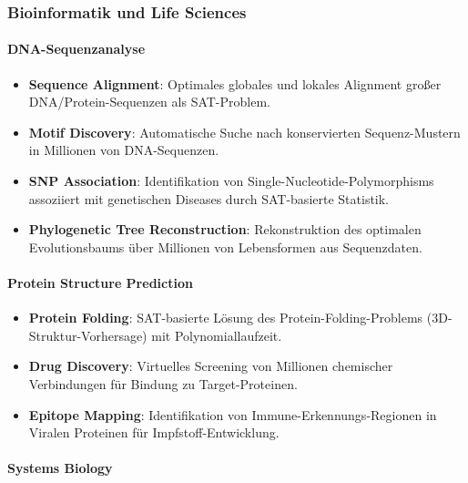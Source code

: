 ﻿\documentclass[a4paper,12pt]{article}
\theoremstyle{definition}
\begin{document}
\subsubsection{Bioinformatik und Life Sciences}

\paragraph{DNA-Sequenzanalyse}

\begin{itemize}
	\item \textbf{Sequence Alignment}: Optimales globales und lokales Alignment großer DNA/Protein-Sequenzen als SAT-Problem.
	
	\item \textbf{Motif Discovery}: Automatische Suche nach konservierten Sequenz-Mustern in Millionen von DNA-Sequenzen.
	
	\item \textbf{SNP Association}: Identifikation von Single-Nucleotide-Polymorphisms assoziiert mit genetischen Diseases durch SAT-basierte Statistik.
	
	\item \textbf{Phylogenetic Tree Reconstruction}: Rekonstruktion des optimalen Evolutionsbaums über Millionen von Lebensformen aus Sequenzdaten.
\end{itemize}

\paragraph{Protein Structure Prediction}

\begin{itemize}
	\item \textbf{Protein Folding}: SAT-basierte Lösung des Protein-Folding-Problems (3D-Struktur-Vorhersage) mit Polynomiallaufzeit.
	
	\item \textbf{Drug Discovery}: Virtuelles Screening von Millionen chemischer Verbindungen für Bindung zu Target-Proteinen.
	
	\item \textbf{Epitope Mapping}: Identifikation von Immune-Erkennungs-Regionen in Viralen Proteinen für Impfstoff-Entwicklung.
\end{itemize}

\paragraph{Systems Biology}
\end{document}
